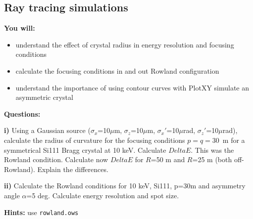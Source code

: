 \subsection{Ray tracing simulations}

\begin{youwillbox}
\textbf{You will:}

\begin{itemize}
    \item understand the effect of crystal radius in energy resolution and focusing conditions
    \item calculate the focusing conditions in and out Rowland configuration
    \item understand the importance of using contour curves with PlotXY simulate an asymmetric crystal
\end{itemize}
\end{youwillbox}

\begin{questionsbox}
\textbf{Questions:}

\textbf{i)} Using a Gaussian source ($\sigma_x$=10$\mu$m, $\sigma_z$=10$\mu$m, $\sigma_x'$=10$\mu$rad, $\sigma_z'$=10$\mu$rad), calculate the radius of curvature for the focusing conditions $p=q=$30~m for a symmetrical Si111 Bragg crystal at 10 keV. Calculate $Delta E$. This was the Rowland condition.
Calculate now $Delta E$ for $R$=50 m and $R$=25 m (both off-Rowland). Explain the differences.

\textbf{ii)} Calculate the Rowland conditions for 10 keV, Si111, p=30m and asymmetry angle $\alpha$=5 deg. Calculate energy resolution and spot size.
\end{questionsbox}

\begin{hintsbox}
\textbf{Hints:} use {\tt rowland.ows}
\end{hintsbox}

